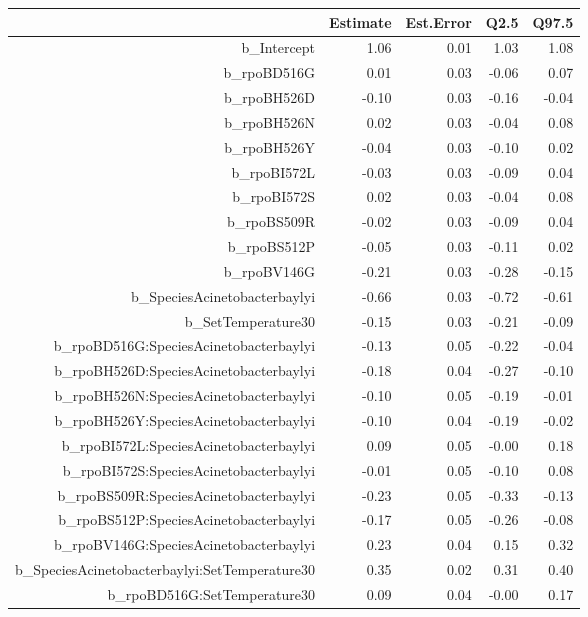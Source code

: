 \begin{table}[ht]
\centering
\begin{tabular}{rrrrr}
  \hline
 & Estimate & Est.Error & Q2.5 & Q97.5 \\ 
  \hline
b\_Intercept & 1.06 & 0.01 & 1.03 & 1.08 \\ 
  b\_rpoBD516G & 0.01 & 0.03 & -0.06 & 0.07 \\ 
  b\_rpoBH526D & -0.10 & 0.03 & -0.16 & -0.04 \\ 
  b\_rpoBH526N & 0.02 & 0.03 & -0.04 & 0.08 \\ 
  b\_rpoBH526Y & -0.04 & 0.03 & -0.10 & 0.02 \\ 
  b\_rpoBI572L & -0.03 & 0.03 & -0.09 & 0.04 \\ 
  b\_rpoBI572S & 0.02 & 0.03 & -0.04 & 0.08 \\ 
  b\_rpoBS509R & -0.02 & 0.03 & -0.09 & 0.04 \\ 
  b\_rpoBS512P & -0.05 & 0.03 & -0.11 & 0.02 \\ 
  b\_rpoBV146G & -0.21 & 0.03 & -0.28 & -0.15 \\ 
  b\_SpeciesAcinetobacterbaylyi & -0.66 & 0.03 & -0.72 & -0.61 \\ 
  b\_SetTemperature30 & -0.15 & 0.03 & -0.21 & -0.09 \\ 
  b\_rpoBD516G:SpeciesAcinetobacterbaylyi & -0.13 & 0.05 & -0.22 & -0.04 \\ 
  b\_rpoBH526D:SpeciesAcinetobacterbaylyi & -0.18 & 0.04 & -0.27 & -0.10 \\ 
  b\_rpoBH526N:SpeciesAcinetobacterbaylyi & -0.10 & 0.05 & -0.19 & -0.01 \\ 
  b\_rpoBH526Y:SpeciesAcinetobacterbaylyi & -0.10 & 0.04 & -0.19 & -0.02 \\ 
  b\_rpoBI572L:SpeciesAcinetobacterbaylyi & 0.09 & 0.05 & -0.00 & 0.18 \\ 
  b\_rpoBI572S:SpeciesAcinetobacterbaylyi & -0.01 & 0.05 & -0.10 & 0.08 \\ 
  b\_rpoBS509R:SpeciesAcinetobacterbaylyi & -0.23 & 0.05 & -0.33 & -0.13 \\ 
  b\_rpoBS512P:SpeciesAcinetobacterbaylyi & -0.17 & 0.05 & -0.26 & -0.08 \\ 
  b\_rpoBV146G:SpeciesAcinetobacterbaylyi & 0.23 & 0.04 & 0.15 & 0.32 \\ 
  b\_SpeciesAcinetobacterbaylyi:SetTemperature30 & 0.35 & 0.02 & 0.31 & 0.40 \\ 
  b\_rpoBD516G:SetTemperature30 & 0.09 & 0.04 & -0.00 & 0.17 \\ 

\end{tabular}
\end{table}
